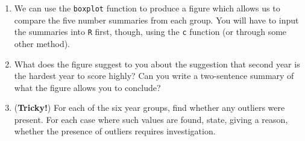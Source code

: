 \documentclass[11pt,a4paper]{article}
\begin{document}
\begin{enumerate}
\begin{enumerate}
\item We can use the \texttt{boxplot} function to produce a figure which allows us to compare the five number summaries from each group. You will have to input the summaries into \texttt{R} first, though, using the \texttt{c} function (or through some other method).

\item What does the figure suggest to you about the suggestion that second year is the hardest year to score highly? Can you write a two-sentence summary of what the figure allows you to conclude?

\item (\textbf{Tricky!}) For each of the six year groups, find whether any outliers were present. For each case where such values are found, state, giving a reason, whether the presence of outliers requires investigation.
\end{enumerate}
  
\end{enumerate}
 
 
\end{document}
